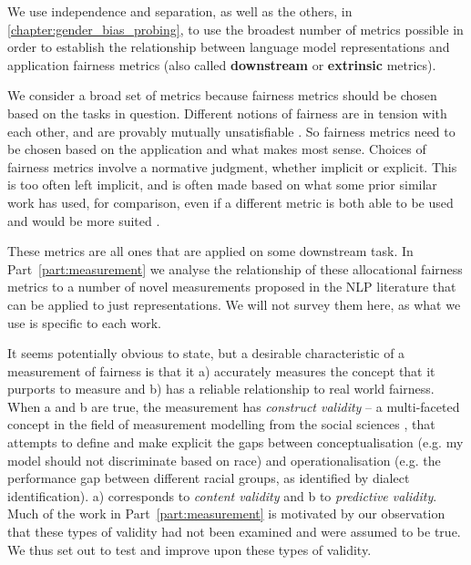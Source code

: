 We use independence and separation, as well as the others, in \ref{chapter:gender_bias_probing}, to use the broadest number of metrics possible in order to establish the relationship between language model representations and application fairness metrics (also called \textbf{downstream} or \textbf{extrinsic} metrics). 

We consider a broad set of metrics because fairness metrics should be chosen based on the tasks in question. Different notions of fairness are in tension with each other, and are provably mutually unsatisfiable \citet{barocas-hardt-narayanan}. So fairness metrics need to be chosen based on the application and what makes most sense. Choices of fairness metrics involve a normative judgment, whether implicit or explicit. This is too often left implicit, and is often made based on what some prior similar work has used, for comparison, even if a different metric is both able to be used and would be more suited \citep{orgad-belinkov-2022-choose}.

These metrics are all ones that are applied on some downstream task. In Part~\ref{part:measurement} we analyse the relationship of these allocational fairness metrics to a number of novel measurements proposed in the NLP literature that can be applied to just representations. We will not survey them here, as what we use is specific to each work.

It seems potentially obvious to state, but a desirable characteristic of a measurement of fairness is that it a) accurately measures the concept that it purports to measure and b) has a reliable relationship to real world fairness. When a and b are true, the measurement has \textit{construct validity} -- a multi-faceted concept in the field of measurement modelling from the social sciences \citep{jacobsandwallach}, that attempts to define and make explicit the gaps between conceptualisation (e.g. my model should not discriminate based on race) and operationalisation (e.g. the performance gap between different racial groups, as identified by dialect identification). a) corresponds to \textit{content validity} and b to \textit{predictive validity}. Much of the work in Part~\ref{part:measurement} is motivated by our observation that these types of validity had not been examined and were assumed to be true. We thus set out to test and improve upon these types of validity.

